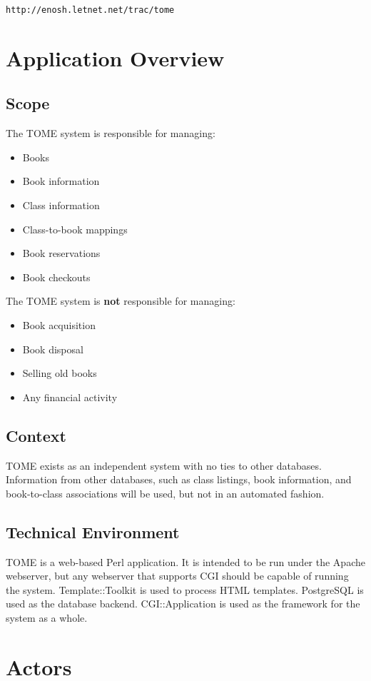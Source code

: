 \documentclass[12pt,titlepage]{article}
\begin{document}
\texttt{http://enosh.letnet.net/trac/tome}
\section{Application Overview}
\subsection{Scope}
The TOME system is responsible for managing:
\begin{itemize}
	\item Books
	\item Book information
	\item Class information
	\item Class-to-book mappings
	\item Book reservations
	\item Book checkouts
\end{itemize}
The TOME system is \textbf{not} responsible for managing:
\begin{itemize}
	\item Book acquisition
	\item Book disposal
	\item Selling old books
	\item Any financial activity
\end{itemize}
\subsection{Context}
TOME exists as an independent system with no ties to other databases.  Information from other databases, such as class listings, book information, and book-to-class associations will be used, but not in an automated fashion.
\subsection{Technical Environment}
TOME is a web-based Perl application.  It is intended to be run under the Apache webserver, but any webserver that supports CGI should be capable of running the system.  Template::Toolkit is used to process HTML templates.  PostgreSQL is used as the database backend.  CGI::Application is used as the framework for the system as a whole.
\section{Actors}
\end{document}
